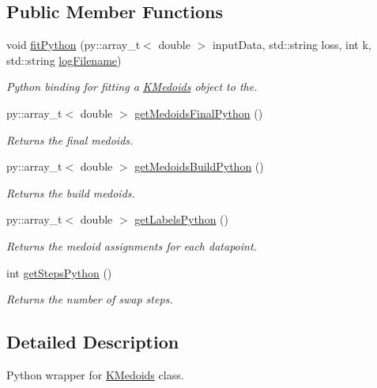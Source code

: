 \subsection*{Public Member Functions}
\begin{DoxyCompactItemize}
\item 
void \hyperlink{classKMedsWrapper_a84e7535d6cdd70187c774811a210adc6}{fit\+Python} (py\+::array\+\_\+t$<$ double $>$ input\+Data, std\+::string loss, int k, std\+::string \hyperlink{classKMedoids_a3cf57e612442072fb377b1714fc5e12e}{log\+Filename})
\begin{DoxyCompactList}\small\item\em Python binding for fitting a \hyperlink{classKMedoids}{K\+Medoids} object to the. \end{DoxyCompactList}\item 
py\+::array\+\_\+t$<$ double $>$ \hyperlink{classKMedsWrapper_ae825241c43b8bf92912eb59cd12ae1c5}{get\+Medoids\+Final\+Python} ()
\begin{DoxyCompactList}\small\item\em Returns the final medoids. \end{DoxyCompactList}\item 
py\+::array\+\_\+t$<$ double $>$ \hyperlink{classKMedsWrapper_af272debff6f3b31490d20b8dc7bec322}{get\+Medoids\+Build\+Python} ()
\begin{DoxyCompactList}\small\item\em Returns the build medoids. \end{DoxyCompactList}\item 
py\+::array\+\_\+t$<$ double $>$ \hyperlink{classKMedsWrapper_aba0a92e75230b7853fd533657ead656e}{get\+Labels\+Python} ()
\begin{DoxyCompactList}\small\item\em Returns the medoid assignments for each datapoint. \end{DoxyCompactList}\item 
int \hyperlink{classKMedsWrapper_a25ac2830354eeae7963cdec34d0137e8}{get\+Steps\+Python} ()
\begin{DoxyCompactList}\small\item\em Returns the number of swap steps. \end{DoxyCompactList}\end{DoxyCompactItemize}


\subsection{Detailed Description}
Python wrapper for \hyperlink{classKMedoids}{K\+Medoids} class. 

